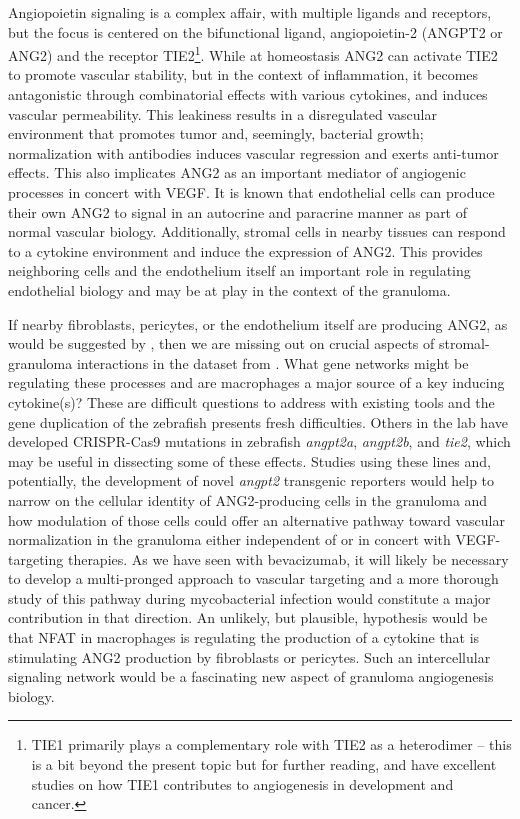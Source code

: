 Angiopoietin signaling is a complex affair, with multiple ligands and receptors, but the focus is centered on the bifunctional ligand, angiopoietin-2 (ANGPT2 or ANG2) and the receptor TIE2\footnote{TIE1 primarily plays a complementary role with TIE2 as a heterodimer -- this is a bit beyond the present topic but for further reading, \citet{Savant2015} and \citet{LaPorta2018} have excellent studies on how TIE1 contributes to angiogenesis in development and cancer.}. While at homeostasis ANG2 can activate TIE2 to promote vascular stability, but in the context of inflammation, it becomes antagonistic through combinatorial effects with various cytokines, and induces vascular permeability. This leakiness results in a disregulated vascular environment that promotes tumor and, seemingly, bacterial growth; normalization with antibodies induces vascular regression and exerts anti-tumor effects. This also implicates ANG2 as an important mediator of angiogenic processes in concert with VEGF. It is known that endothelial cells can produce their own ANG2 to signal in an autocrine and paracrine manner as part of normal vascular biology. Additionally, stromal cells in nearby tissues can respond to a cytokine environment and induce the expression of ANG2. This provides neighboring cells and the endothelium itself an important role in regulating endothelial biology and may be at play in the context of the granuloma.

If nearby fibroblasts, pericytes, or the endothelium itself are producing ANG2, as would be suggested by \citet{Gideon2022}, then we are missing out on crucial aspects of stromal-granuloma interactions in the dataset from \citet{Cronan2021}. What gene networks might be regulating these processes and are macrophages a major source of a key inducing cytokine(s)? These are difficult questions to address with existing tools and the gene duplication of the zebrafish presents fresh difficulties. Others in the lab have developed CRISPR-Cas9 mutations in zebrafish \textit{angpt2a}, \textit{angpt2b}, and \textit{tie2}, which may be useful in dissecting some of these effects. Studies using these lines and, potentially, the development of novel \textit{angpt2} transgenic reporters would help to narrow on the cellular identity of ANG2-producing cells in the granuloma and how modulation of those cells could offer an alternative pathway toward vascular normalization in the granuloma either independent of or in concert with VEGF-targeting therapies. As we have seen with bevacizumab, it will likely be necessary to develop a multi-pronged approach to vascular targeting and a more thorough study of this pathway during mycobacterial infection would constitute a major contribution in that direction. An unlikely, but plausible, hypothesis would be that NFAT in macrophages is regulating the production of a cytokine that is stimulating ANG2 production by fibroblasts or pericytes. Such an intercellular signaling network would be a fascinating new aspect of granuloma angiogenesis biology.

